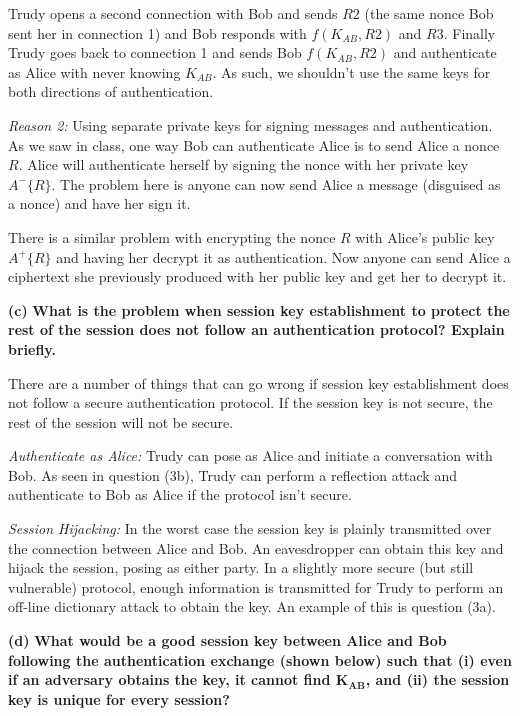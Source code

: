 \documentclass[11pt]{article}
\renewcommand\part[1]{\vspace{.10in}\textbf{(#1)}}
\begin{document}
Trudy opens a second connection with Bob and sends $R2$ (the same nonce Bob sent her in connection 1) and Bob responds with $f(K_{AB}, R2)$ and $R3$. Finally Trudy goes back to connection 1 and sends Bob $f(K_{AB}, R2)$ and authenticate as Alice with never knowing $K_{AB}$. As such, we shouldn't use the same keys for both directions of authentication.

\textit{Reason 2:} Using separate private keys for signing messages and authentication. As we saw in class, one way Bob can authenticate Alice is to send Alice a nonce $R$. Alice will authenticate herself by signing the nonce with her private key $A^-\{R\}$. The problem here is anyone can now send Alice a message (disguised as a nonce) and have her sign it.

There is a similar problem with encrypting the nonce $R$ with Alice's public key $A^+\{R\}$ and having her decrypt it as authentication. Now anyone can send Alice a ciphertext she previously produced with her public key and get her to decrypt it. 

\part{c} \textbf{What is the problem when session key establishment to protect the rest of the session does not follow an authentication protocol? Explain briefly.}

There are a number of things that can go wrong if session key establishment does not follow a secure authentication protocol. If the session key is not secure, the rest of the session will not be secure.

\textit{Authenticate as Alice:} Trudy can pose as Alice and initiate a conversation with Bob. As seen in question (3b), Trudy can perform a reflection attack and authenticate to Bob as Alice if the protocol isn't secure.

\textit{Session Hijacking:} In the worst case the session key is plainly transmitted over the connection between Alice and Bob. An eavesdropper can obtain this key and hijack the session, posing as either party. In a slightly more secure (but still vulnerable) protocol, enough information is transmitted for Trudy to perform an off-line dictionary attack to obtain the key. An example of this is question (3a).

\part{d} \textbf{What would be a good session key between Alice and Bob following the authentication exchange (shown below) such that (i) even if an adversary obtains the key, it cannot find $\mathbf{K_{AB}}$, and (ii) the session key is unique for every session?}
\end{document}
